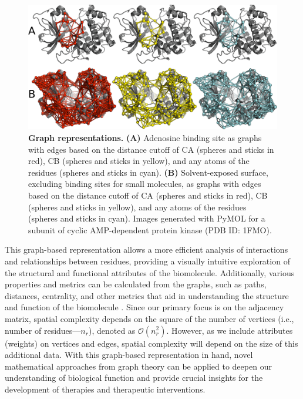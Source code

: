 \documentclass[Ingles]{phdthesis}
\def\ie{i.e.\onedot}
\begin{document}
\begin{figure}[H]
\centerline{\includegraphics[scale=1.5]{images/graph-representation.png}}
\caption[Graph representations]{\textbf{Graph representations.} \textbf{(A)} Adenosine binding site as graphs with edges based on the distance cutoff of \acs{CA} (spheres and sticks in red), \acs{CB} (spheres and sticks in yellow), and any atoms of the residues (spheres and sticks in cyan). \textbf{(B)} Solvent-exposed surface, excluding binding sites for small molecules, as graphs with edges based on the distance cutoff of \acs{CA} (spheres and sticks in red), \acs{CB} (spheres and sticks in yellow), and any atoms of the residues (spheres and sticks in cyan). Images generated with PyMOL for a subunit of cyclic AMP-dependent protein kinase (PDB ID: 1FMO).}
\label{fig:graph-representation}
\end{figure}

This graph-based representation allows a more efficient analysis of interactions and relationships between residues, providing a visually intuitive exploration of the structural and functional attributes of the biomolecule. Additionally, various properties and metrics can be calculated from the graphs, such as paths, distances, centrality, and other metrics that aid in understanding the structure and function of the biomolecule \cite{majeed2020,vishveshwara2002,mason2007}. Since our primary focus is on the adjacency matrix, spatial complexity depends on the square of the number of vertices (\ie, number of residues---$n_r$), denoted as $\mathcal{O}(n_{r}^{2})$. However, as we include attributes (weights) on vertices and edges, spatial complexity will depend on the size of this additional data. With this graph-based representation in hand, novel mathematical approaches from graph theory can be applied to deepen our understanding of biological function and provide crucial insights for the development of therapies and therapeutic interventions.
\end{document}
